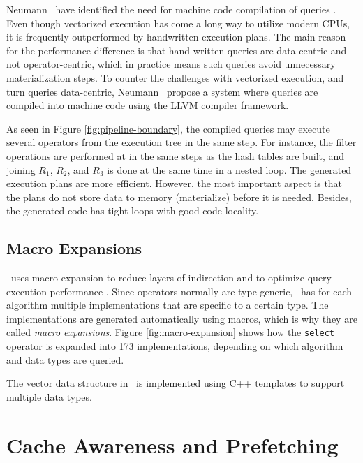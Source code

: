 Neumann \ea~have identified the need for machine code compilation of queries \cite{Neumann2011-uq}. Even though vectorized execution has come a long way to utilize modern CPUs, it is frequently outperformed by handwritten execution plans. The main reason for the performance difference is that hand-written queries are data-centric and not operator-centric, which in practice means such queries avoid unnecessary materialization steps. To counter the challenges with vectorized execution, and turn queries data-centric, Neumann \ea~propose a system where queries are compiled into machine code using the LLVM compiler framework.

As seen in Figure \ref{fig:pipeline-boundary}, the compiled queries may execute several operators from the execution tree in the same step. For instance, the filter operations are performed at in the same steps as the hash tables are built, and joining $R_1$, $R_2$, and $R_3$ is done at the same time in a nested loop. The generated execution plans are more efficient. However, the most important aspect is that the plans do not store data to memory (materialize) before it is needed. Besides, the generated code has tight loops with good code locality.

\subsection{Macro Expansions}
\label{sub:Macro Expansions}

\monetdb~uses macro expansion to reduce layers of indirection and to optimize query execution performance \cite{Boncz2002-yj}. Since operators normally are type-generic, \monetdb~has for each algorithm multiple implementations that are specific to a certain type. The implementations are generated automatically using macros, which is why they are called \textit{macro expansions}. Figure \ref{fig:macro-expansion} shows how the \texttt{select} operator is expanded into 173 implementations, depending on which algorithm and data types are queried.

The vector data structure in \ibm~is implemented using C++ templates to support multiple data types.

\section{Cache Awareness and Prefetching}
\label{sec:Cache Awareness and Prefetching}


